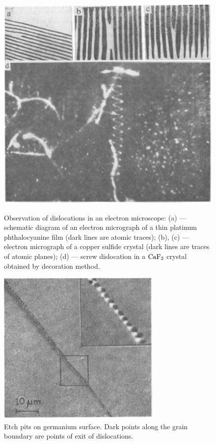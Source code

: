 \begin{figure}[t]
	\begin{minipage}[t]{0.62\linewidth}
		\begin{center}
			\includegraphics[scale=0.8]{figures/ch_02/fig_2_14.pdf}
			\caption[]{Observation of dislocations in an electron microscope: (a) --- schematic diagram of an electron micrograph of a thin platinum phthalocyanine film (dark lines are atomic traces); (b), (c) --- electron micrograph of a copper sulfide crystal (dark lines are traces of atomic planes); (d) --- screw dislocation in a $\ce{CaF2}$ crystal obtained by decoration method.}
			\label{fig:2_14}
		\end{center}
	\end{minipage}
	\hfill{ }%
	\begin{minipage}[t]{0.34\linewidth}
		\begin{center}
			\includegraphics[scale=0.8]{figures/ch_02/fig_2_15.pdf}
			\caption[]{Etch pits on germanium surface. Dark points along the grain boundary are points of exit of dislocations.}
			\label{fig:2_15}
		\end{center}
	\end{minipage}
\vspace{-0.3cm}
\end{figure}

